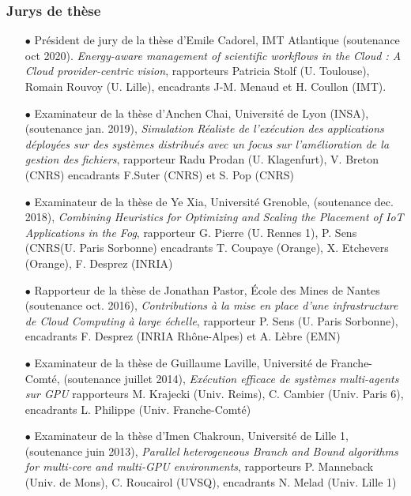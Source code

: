 \subsubsection{Jurys de thèse}

\begin{itemize}

\item[$\bullet$] 
	  Président de jury de la thèse d'Emile Cadorel, IMT Atlantique (soutenance oct 2020). \textit{Energy-aware management of scientific workflows in the Cloud : A Cloud provider-centric vision}, rapporteurs Patricia Stolf (U. Toulouse), Romain Rouvoy (U. Lille), encadrants J-M. Menaud et H. Coullon (IMT).

\item[$\bullet$] 
Examinateur de la thèse d'Anchen Chai, Université de Lyon (INSA),
(soutenance jan. 2019), \textit{Simulation Réaliste de l'exécution des
  applications déployées sur des systèmes distribués avec un focus sur
  l'amélioration de la gestion des fichiers},
rapporteur Radu Prodan (U. Klagenfurt), V. Breton (CNRS) 
encadrants F.Suter (CNRS) et S. Pop (CNRS)\\


\item[$\bullet$] 
Examinateur de la thèse de Ye Xia, Université Grenoble,
(soutenance dec. 2018), \textit{Combining Heuristics for Optimizing and Scaling
  the Placement of IoT Applications in the Fog},
rapporteur G. Pierre (U. Rennes 1), P. Sens (CNRS(U. Paris Sorbonne) 
encadrants T. Coupaye (Orange), X. Etchevers (Orange), F. Desprez (INRIA)\\

\item[$\bullet$] 
Rapporteur de la thèse de Jonathan Pastor, \'Ecole des Mines de Nantes
(soutenance oct. 2016), \textit{Contributions à la mise en place d'une
  infrastructure de Cloud Computing à large échelle},
rapporteur P. Sens (U. Paris Sorbonne), 
encadrants F. Desprez (INRIA Rhône-Alpes) et A. Lèbre (EMN)\\

\item[$\bullet$]
Examinateur de la thèse de Guillaume Laville, Université de Franche-Comté,
(soutenance juillet 2014), \textit{Exécution efficace de systèmes multi-agents
  sur GPU}
rapporteurs M. Krajecki (Univ. Reims), C. Cambier (Univ. Paris 6),
encadrants L. Philippe (Univ. Franche-Comté)\\

\item[$\bullet$]
Examinateur de la thèse d'Imen Chakroun, Université de Lille 1,
(soutenance juin 2013), \textit{Parallel heterogeneous Branch and Bound algorithms for multi-core and multi-GPU environments},
rapporteurs P. Manneback (Univ. de Mons), C. Roucairol (UVSQ),
encadrants N. Melad (Univ. Lille 1)\\


\end{itemize}
